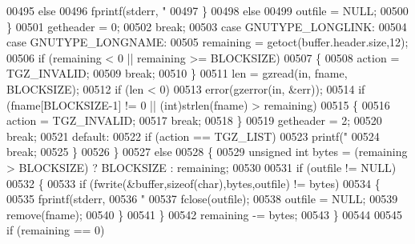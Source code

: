 \begin{DoxyCode}
{{{{{{{00495                       \textcolor{keywordflow}{else}
00496                         fprintf(stderr, \textcolor{stringliteral}{"%
00497                     \}
00498                   \textcolor{keywordflow}{else}
00499                     outfile = NULL;
00500                 \}
00501               getheader = 0;
00502               \textcolor{keywordflow}{break};
00503             \textcolor{keywordflow}{case} GNUTYPE\_LONGLINK:
00504             \textcolor{keywordflow}{case} GNUTYPE\_LONGNAME:
00505               remaining = getoct(buffer.header.size,12);
00506               \textcolor{keywordflow}{if} (remaining < 0 || remaining >= BLOCKSIZE)
00507                 \{
00508                   action = TGZ\_INVALID;
00509                   \textcolor{keywordflow}{break};
00510                 \}
00511               len = gzread(in, fname, BLOCKSIZE);
00512               \textcolor{keywordflow}{if} (len < 0)
00513                 error(gzerror(in, &err));
00514               \textcolor{keywordflow}{if} (fname[BLOCKSIZE-1] != 0 || (\textcolor{keywordtype}{int})strlen(fname) > remaining)
00515                 \{
00516                   action = TGZ\_INVALID;
00517                   \textcolor{keywordflow}{break};
00518                 \}
00519               getheader = 2;
00520               \textcolor{keywordflow}{break};
00521             \textcolor{keywordflow}{default}:
00522               \textcolor{keywordflow}{if} (action == TGZ\_LIST)
00523                 printf(\textcolor{stringliteral}{" %
00524               \textcolor{keywordflow}{break};
00525             \}
00526         \}
00527       \textcolor{keywordflow}{else}
00528         \{
00529           \textcolor{keywordtype}{unsigned} \textcolor{keywordtype}{int} bytes = (remaining > BLOCKSIZE) ? BLOCKSIZE : remaining;
00530 
00531           \textcolor{keywordflow}{if} (outfile != NULL)
00532             \{
00533               \textcolor{keywordflow}{if} (fwrite(&buffer,\textcolor{keyword}{sizeof}(\textcolor{keywordtype}{char}),bytes,outfile) != bytes)
00534                 \{
00535                   fprintf(stderr,
00536                     \textcolor{stringliteral}{"%
00537                   fclose(outfile);
00538                   outfile = NULL;
00539                   \textcolor{keyword}{remove}(fname);
00540                 \}
00541             \}
00542           remaining -= bytes;
00543         \}
00544 
00545       \textcolor{keywordflow}{if} (remaining == 0)
}}}}}}}}}}
\end{DoxyCode}
